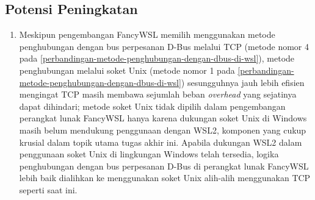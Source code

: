 \subsection{Potensi Peningkatan}

\begin{enumerate}
    \item Meskipun pengembangan FancyWSL memilih menggunakan metode penghubungan dengan bus perpesanan D-Bus melalui TCP (metode nomor 4 pada \autoref{perbandingan-metode-penghubungan-dengan-dbus-di-wsl}), metode penghubungan melalui soket Unix (metode nomor 1 pada \autoref{perbandingan-metode-penghubungan-dengan-dbus-di-wsl}) sesungguhnya jauh lebih efisien mengingat TCP masih membawa sejumlah beban \textit{overhead} yang sejatinya dapat dihindari; metode soket Unix tidak dipilih dalam pengembangan perangkat lunak FancyWSL hanya karena dukungan soket Unix di Windows masih belum mendukung penggunaan dengan WSL2, komponen yang cukup krusial dalam topik utama tugas akhir ini. Apabila dukungan WSL2 dalam penggunaan soket Unix di lingkungan Windows telah tersedia, logika penghubungan dengan bus perpesanan D-Bus di perangkat lunak FancyWSL lebih baik dialihkan ke menggunakan soket Unix alih-alih menggunakan TCP seperti saat ini.
\end{enumerate}


